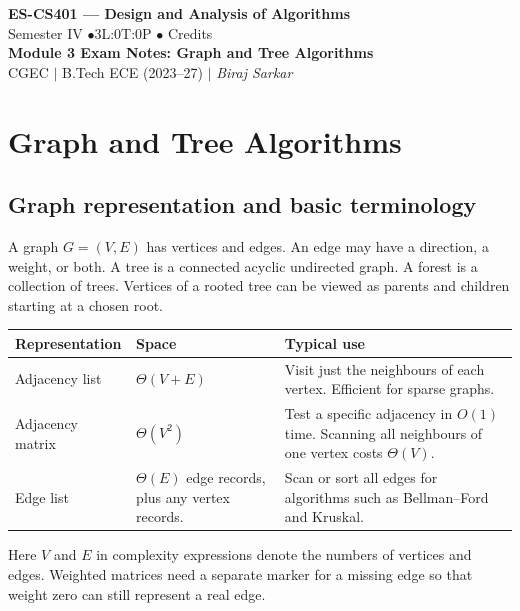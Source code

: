 \documentclass[12pt,a4paper]{article}
\begin{document}
\begin{center}
  {\LARGE\bfseries\color{myred} ES-CS401 --- Design and Analysis of Algorithms}\\[5pt]
  {\normalsize\color{mydark} Semester IV \quad$\bullet$\quad 3L:0T:0P \quad$\bullet$ Credits}\\[3pt]
  {\normalsize\color{myteal}\textbf{Module 3 Exam Notes: Graph and Tree Algorithms}}\\[3pt]
  {\small\color{mydark} CGEC \;$|$\; B.Tech ECE (2023--27) \;$|$\; \textit{Biraj Sarkar}}
\end{center}
\vspace{2pt}
\noindent{\color{myred}\rule{\linewidth}{1.5pt}}
\vspace{2pt}

\hypersetup{linkcolor=mydark}
\tableofcontents
\hypersetup{linkcolor=myteal}
\newpage

\section{Graph and Tree Algorithms}
\subsection{Graph representation and basic terminology}
\begin{tcolorbox}[defbox, title={Graph and tree}]
A graph $G=(V,E)$ has vertices and edges. An edge may have a direction, a weight, or both. A tree is a connected acyclic undirected graph. A forest is a collection of trees. Vertices of a rooted tree can be viewed as parents and children starting at a chosen root.
\end{tcolorbox}

\par\vspace{5pt}
\begingroup
\setlength{\extrarowheight}{1pt}
\noindent\begin{tabularx}{\linewidth}{|B{3.5cm}|Y|Y|}
\hline
\textbf{Representation} & \textbf{Space} & \textbf{Typical use} \\ \hline
Adjacency list & $\Theta(V+E)$ & Visit just the neighbours of each vertex. Efficient for sparse graphs. \\ \hline
Adjacency matrix & $\Theta(V^2)$ & Test a specific adjacency in $O(1)$ time. Scanning all neighbours of one vertex costs $\Theta(V)$. \\ \hline
Edge list & $\Theta(E)$ edge records, plus any vertex records. & Scan or sort all edges for algorithms such as Bellman--Ford and Kruskal. \\ \hline
\end{tabularx}\par
\endgroup
Here $V$ and $E$ in complexity expressions denote the numbers of vertices and edges. Weighted matrices need a separate marker for a missing edge so that weight zero can still represent a real edge.
\end{document}
